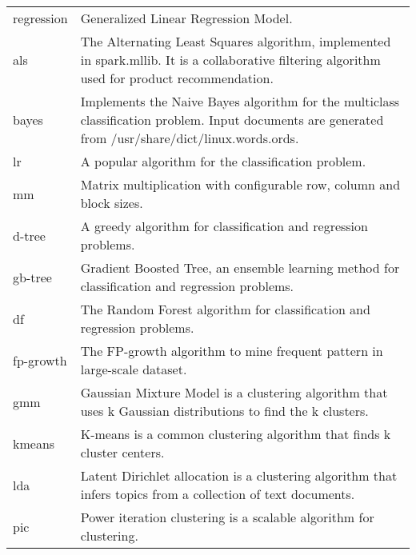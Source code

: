 \begin{table}[!htbp]
{\begin{tabular}{@{}p{2.5cm}p{14cm}@{}}
regression & Generalized Linear Regression Model. \\
als & The Alternating Least Squares algorithm, implemented in spark.mllib. It is a collaborative filtering algorithm used for product recommendation. \\
bayes & Implements the Naive Bayes algorithm for the multiclass classification problem. Input documents are generated from /usr/share/dict/linux.words.ords. \\
lr & A popular algorithm for the classification problem. \\
mm & Matrix multiplication with configurable row, column and block sizes.\\
d-tree & A greedy algorithm for classification and regression problems. \\
gb-tree & Gradient Boosted Tree, an ensemble learning method for classification and regression problems. \\
df & The Random Forest algorithm for classification and regression problems. \\
fp-growth & The FP-growth algorithm to mine frequent pattern in large-scale dataset. \\
gmm & Gaussian Mixture Model is a clustering algorithm that uses k Gaussian distributions to find the k clusters. \\
kmeans & K-means is a common clustering algorithm that finds k cluster centers. \\
lda & Latent Dirichlet allocation is a clustering algorithm that infers topics from a collection of text documents. \\
pic & Power iteration clustering is a scalable algorithm for clustering. \\ \bottomrule
\end{tabular}
}
\end{table}
